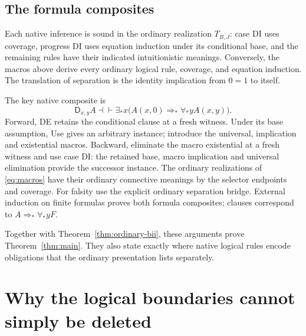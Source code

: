 \documentclass[11pt]{article}
\theoremstyle{definition}
\newcommand{\TB}{T_{B,J}}
\newcommand{\D}{\mathsf D}
\begin{document}
\subsection{The formula composites}

Each native inference is sound in the ordinary realization $\TB$:
case DI uses coverage, progress DI uses equation induction under its
conditional base, and the remaining rules have their indicated
intuitionistic meanings. Conversely, the macros above derive every
ordinary logical rule, coverage, and equation induction. The translation
of separation is the identity implication from $0=1$ to itself.

The key native composite is
\[
 \D_{x,y}A\dashv\vdash
 \exists_*x\bigl(A(x,0)\Rightarrow_*\forall_*y A(x,y)\bigr).
\]
Forward, DE retains the conditional clause at a fresh witness. Under
its base assumption, Use gives an arbitrary instance; introduce the
universal, implication and existential macros. Backward, eliminate the
macro existential at a fresh witness and use case DI: the retained base,
macro implication and universal elimination provide the successor
instance. The ordinary realizations of \eqref{eq:macros} have their
ordinary connective meanings by the selector endpoints and coverage.
For falsity use the explicit ordinary separation bridge. External
induction on finite formulas proves both formula composites; clauses
correspond to $A\Rightarrow_*\forall_*yF$.

Together with Theorem~\ref{thm:ordinary-bii}, these arguments prove
Theorem~\ref{thm:main}. They also state exactly where native logical
rules encode obligations that the ordinary presentation lists separately.

\section{Why the logical boundaries cannot simply be deleted}
\label{sec:boundaries}
\end{document}
